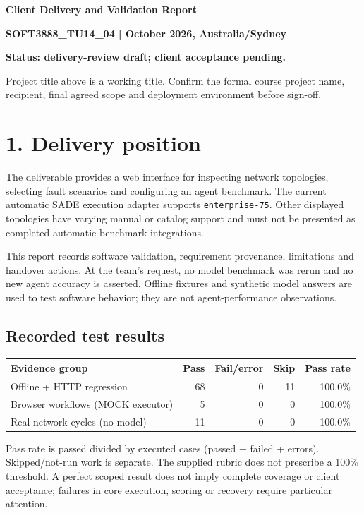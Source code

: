 \documentclass[10pt,a4paper]{article}
\begin{document}
{\color{accent}\Large\bfseries Client Delivery and Validation Report}\par
\textbf{SOFT3888\_TU14\_04 \quad |  October 2026, Australia/Sydney}\par
\textbf{Status: delivery-review draft; client acceptance pending.}\par
Project title above is a working title. Confirm the formal course project name, recipient, final agreed scope and deployment environment before sign-off.

\section*{1. Delivery position}
The deliverable provides a web interface for inspecting network topologies, selecting fault scenarios and configuring an agent benchmark. The current automatic SADE execution adapter supports \texttt{enterprise-75}. Other displayed topologies have varying manual or catalog support and must not be presented as completed automatic benchmark integrations.

This report records software validation, requirement provenance, limitations and handover actions. At the team's request, no model benchmark was rerun and no new agent accuracy is asserted. Offline fixtures and synthetic model answers are used to test software behavior; they are not agent-performance observations.

\subsection*{Recorded test results}
\begin{tabularx}{\textwidth}{@{}Xrrrr@{}}\toprule
Evidence group & Pass & Fail/error & Skip & Pass rate \\
\midrule
Offline + HTTP regression & 68 & 0 & 11 & 100.0\% \\
Browser workflows (MOCK executor) & 5 & 0 & 0 & 100.0\% \\
Real network cycles (no model) & 11 & 0 & 0 & 100.0\% \\
\bottomrule\end{tabularx}

Pass rate is passed divided by executed cases (passed + failed + errors). Skipped/not-run work is separate. The supplied rubric does not prescribe a 100\% threshold. A perfect scoped result does not imply complete coverage or client acceptance; failures in core execution, scoring or recovery require particular attention.
\end{document}
